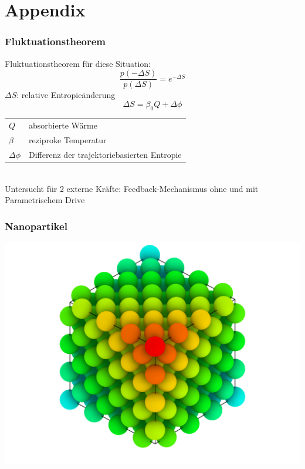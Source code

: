 \documentclass{beamer}
\begin{document}
\section*{Appendix}
\begin{frame}
\frametitle{Fluktuationstheorem}
Fluktuationstheorem für diese Situation:
\begin{equation}
    \label{eq:fluctuationtheorem}
    \frac{p(-\Delta S)}{p(\Delta S)} = e^{-\Delta S}
\end{equation}
$\Delta S$: relative Entropieänderung
\begin{equation}
    \Delta S = \beta_0 Q + \Delta \phi
\end{equation}
\begin{tabular}{l l}
$Q$ & absorbierte Wärme\\
$\beta$ & reziproke Temperatur\\
$\Delta \phi$ & Differenz der trajektoriebasierten Entropie
\end{tabular}\\
Untersucht für 2 externe Kräfte: Feedback-Mechanismus ohne und mit Parametrischem Drive
\end{frame}

\begin{frame}
\frametitle{Nanopartikel}
\begin{center}
\includegraphics[scale=0.2]{../images/fcc_rendering_layer_newcoloring.png}
\end{center}
\end{frame}
\end{document}
